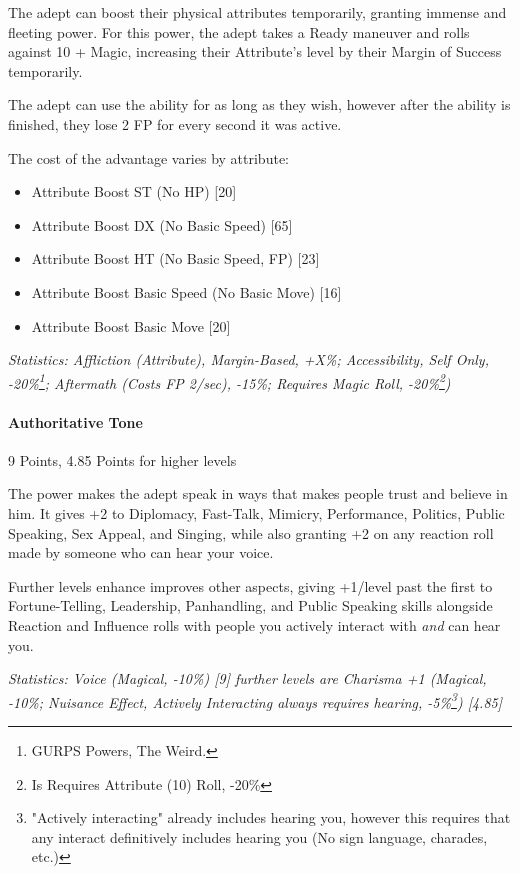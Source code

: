 \begin{multicols*}{3}
	The adept can boost their physical attributes temporarily, granting immense and fleeting power. For this power, the adept takes a Ready maneuver and rolls against 10 + Magic, increasing their Attribute's level by their Margin of Success temporarily. 
	
	The adept can use the ability for as long as they wish, however after the ability is finished, they lose 2 FP for every second it was active.
	
	The cost of the advantage varies by attribute:
	
	\begin{itemize}
		\itemsep 0pt
		\item Attribute Boost ST (No HP) [20]
		\item Attribute Boost DX (No Basic Speed) [65]
		\item Attribute Boost HT (No Basic Speed, FP) [23]
		\item Attribute Boost Basic Speed (No Basic Move) [16]
		\item Attribute Boost Basic Move [20]
	\end{itemize}
	
	\textcolor{OliveGreen}{\textit{Statistics: Affliction (Attribute), Margin-Based, +X\%; Accessibility, Self Only, -20\%\footnote{GURPS Powers, The Weird.}; Aftermath (Costs FP 2/sec), -15\%; Requires Magic Roll, -20\%\footnote{Is Requires Attribute (10) Roll, -20\%}) }}
	
	\paragraph{Authoritative Tone}
	\begin{flushright}
		9 Points, 4.85 Points for higher levels
	\end{flushright}
			
	The power makes the adept speak in ways that makes people trust and believe in him. It gives +2 to Diplomacy, Fast-Talk, Mimicry, Performance, Politics, Public Speaking, Sex Appeal, and Singing, while also granting +2 on any reaction roll made by someone who can hear your voice.
	
	Further levels enhance improves other aspects, giving +1/level past the first to Fortune-Telling, Leadership, Panhandling, and Public Speaking skills alongside Reaction and Influence rolls with people you actively interact with \textit{and} can hear you.
			
	\textcolor{OliveGreen}{\textit{Statistics: Voice (Magical, -10\%) [9] further levels are Charisma +1 (Magical, -10\%; Nuisance Effect, Actively Interacting always requires hearing, -5\%\footnote{"Actively interacting" already includes hearing you, however this requires that any interact definitively includes hearing you (No sign language, charades, etc.)}) [4.85]}}
			

\end{multicols*}
